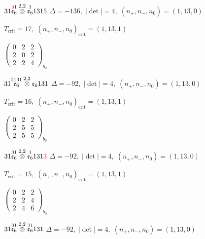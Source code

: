 \documentclass[10pt]{article}
\begin{document}
$31\overset{\textcolor{red}{3}1}{\mathfrak{e}_6}\overset{2,2}{\otimes}\overset{1}{\mathfrak{e}_6}1315$ \quad $\Delta=-136,\; |\det|=4,\; (n_+,n_-,n_0)=(1,13,0)$

\hspace{1em}$T_{\text{crit}}=17,\; (n_+,n_-,n_0)_{\text{crit}}=(1,13,1)$

\hspace{2em}$\left(\begin{smallmatrix}0 & 2 & 2 \\ 2 & 0 & 2 \\ 2 & 2 & 4\end{smallmatrix}\right)_{\!b_0}$

\smallskip

$31\overset{\textcolor{red}{3}131}{\mathfrak{e}_6}\overset{2,2}{\otimes}\mathfrak{e}_6131$ \quad $\Delta=-92,\; |\det|=4,\; (n_+,n_-,n_0)=(1,13,0)$

\hspace{1em}$T_{\text{crit}}=16,\; (n_+,n_-,n_0)_{\text{crit}}=(1,13,1)$

\hspace{2em}$\left(\begin{smallmatrix}0 & 2 & 2 \\ 2 & 5 & 5 \\ 2 & 5 & 5\end{smallmatrix}\right)_{\!b_0}$

\smallskip

$31\overset{31}{\mathfrak{e}_6}\overset{2,2}{\otimes}\overset{1}{\mathfrak{e}_6}131\textcolor{red}{3}$ \quad $\Delta=-92,\; |\det|=4,\; (n_+,n_-,n_0)=(1,13,0)$

\hspace{1em}$T_{\text{crit}}=15,\; (n_+,n_-,n_0)_{\text{crit}}=(1,13,1)$

\hspace{2em}$\left(\begin{smallmatrix}0 & 2 & 2 \\ 2 & 2 & 4 \\ 2 & 4 & 6\end{smallmatrix}\right)_{\!b_0}$

$31\overset{31}{\mathfrak{e}_6}\overset{2,2}{\otimes}\overset{\textcolor{red}{3}1}{\mathfrak{e}_6}131$ \quad $\Delta=-92,\; |\det|=4,\; (n_+,n_-,n_0)=(1,13,0)$
\end{document}
